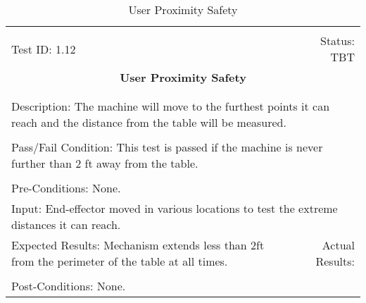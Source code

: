 \documentclass[titlepage]{article}
\begin{document}
\begin{center}%
\begin{table}
\begin{tabular}{|l r|}\hline&\\[-2mm]
	Test ID: 1.12	&Status: TBT\\[-3mm]
	\multicolumn{2}{|c|}{\textbf{\large{User Proximity Safety}}}\\&\\\hline&\\[-3mm]
	\multicolumn{2}{|p{\textwidth}|}{Description: The machine will move to the furthest points it can reach and the distance from the table will be measured.}\\[1mm]\hline&\\[-3mm]
	\multicolumn{2}{|p{\textwidth}|}{Pass/Fail Condition: This test is passed if the machine is never further than 2 ft away from the table.}\\[1mm]\hline&\\[-3mm]
	\multicolumn{2}{|p{\textwidth}|}{Pre-Conditions: None.}\\[4mm]
	\multicolumn{2}{|p{\textwidth}|}{Input: End-effector moved in various locations to test the extreme distances it can reach.}\\[2mm]\hline
	\multicolumn{1}{|p{0.49\textwidth}}{Expected Results: Mechanism extends less than 2ft from the perimeter of the table at all times.}	&\multicolumn{1}{|p{0.45\textwidth}|}{Actual Results:}\\\hline&\\[-3mm]
	\multicolumn{2}{|p{\textwidth}|}{Post-Conditions: None.}\\\hline
\end{tabular}
\caption{User Proximity Safety}
\end{table}
\end{center}
\end{document}
